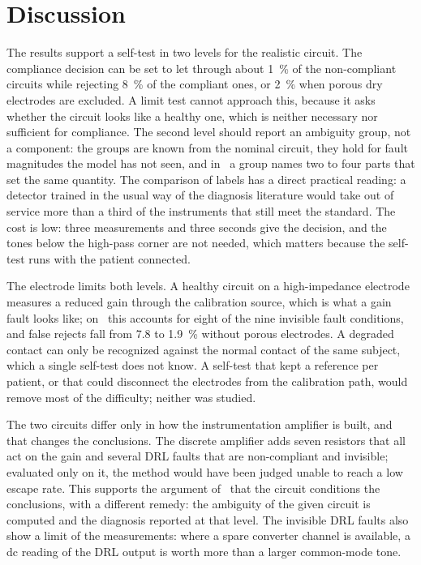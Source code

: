 \section{Discussion}
\label{sec:discussion}

The results support a self-test in two levels for the realistic circuit. The compliance decision
can be set to let through about \SI{1}{\percent} of the non-compliant circuits while rejecting
\SI{8}{\percent} of the compliant ones, or \SI{2}{\percent} when porous dry electrodes are
excluded. A limit test cannot approach this, because it asks whether the circuit looks like a
healthy one, which is neither necessary nor sufficient for compliance. The second level should
report an ambiguity group, not a component: the groups are known from the nominal circuit, they
hold for fault magnitudes the model has not seen, and in \cA\ a group names two to four parts
that set the same quantity. The comparison of labels has a direct practical reading: a detector
trained in the usual way of the diagnosis literature would take out of service more than a third
of the instruments that still meet the standard. The cost is low: three measurements and three
seconds give the decision, and the tones below the high-pass corner are not needed, which
matters because the self-test runs with the patient connected.

The electrode limits both levels. A healthy circuit on a high-impedance electrode measures a
reduced gain through the calibration source, which is what a gain fault looks like; on \cA\ this
accounts for eight of the nine invisible fault conditions, and false rejects fall from 7.8 to
\SI{1.9}{\percent} without porous electrodes. A
degraded contact can only be recognized against the normal contact of the same subject, which a
single self-test does not know. A self-test that kept a reference per patient, or that could
disconnect the electrodes from the calibration path, would remove most of the difficulty;
neither was studied.

The two circuits differ only in how the instrumentation amplifier is built, and that changes the
conclusions. The discrete amplifier adds seven resistors that all act on the gain and several
DRL faults that are non-compliant and invisible; evaluated only on it, the method would have been
judged unable to reach a low escape rate. This supports the argument of~\cite{chen2025} that the
circuit conditions the conclusions, with a different remedy: the ambiguity of the given circuit
is computed and the diagnosis reported at that level. The invisible DRL faults also show a limit
of the measurements: where a spare converter channel is available, a dc reading of the DRL output
is worth more than a larger common-mode tone.

